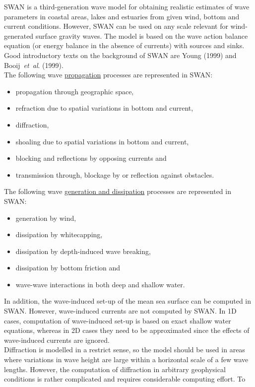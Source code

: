 \documentclass[12pt]{book}
\begin{document}
SWAN is a third-generation wave model for
obtaining realistic estimates of wave parameters in coastal areas, lakes and estuaries from given wind, bottom and
current conditions. However, SWAN can be used on any scale relevant for wind-generated surface gravity waves. The model
is based on the wave action balance equation (or energy balance in the absence of currents) with sources and sinks.
Good introductory texts on the background of SWAN are Young (1999) and Booij~{\it et~al}. (1999).
\\[2ex]
\noindent
The following wave \underline{propagation} processes are represented in SWAN:
\begin{itemize}
 \item propagation through geographic space,
 \item refraction due to spatial variations in bottom and current,
 \item diffraction,
 \item shoaling due to spatial variations in bottom and current,
 \item blocking and reflections by opposing currents and
 \item transmission through, blockage by or reflection against obstacles.
\end{itemize}
The following wave \underline{generation and dissipation} processes are represented in SWAN:
\begin{itemize}
 \item generation by wind,
 \item dissipation by whitecapping,
 \item dissipation by depth-induced wave breaking,
 \item dissipation by bottom friction and
 \item wave-wave interactions in both deep and shallow water.
\end{itemize}
In addition, the wave-induced set-up of the mean sea surface can be computed in SWAN. However, wave-induced
currents are not computed by SWAN. In 1D cases, computation of wave-induced set-up is based on exact shallow
water equations, whereas in 2D cases they need to be approximated since the effects of wave-induced currents
are ignored.
\\[2ex]
\noindent
Diffraction is modelled in a restrict sense, so the model should be used in areas where variations in
wave height are large within a horizontal scale of a few wave lengths. However, the computation of diffraction
in arbitrary geophysical conditions is rather complicated and requires considerable computing effort. To
\end{document}
